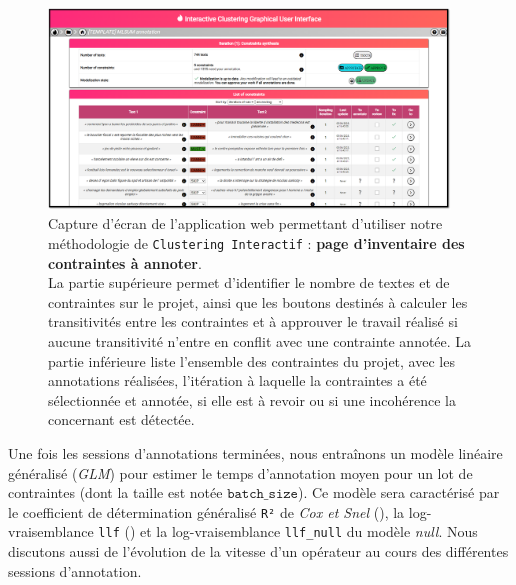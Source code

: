 			\begin{figure}[!htb]
				\centering
				\includegraphics[width=0.95\textwidth]{figures/etude-temps-annotation-0application-liste-contraintes}
				\caption{
					Capture d'écran de l'application web permettant d'utiliser notre méthodologie de \texttt{Clustering Interactif} : \textbf{page d'inventaire des contraintes à annoter}.\\
					La partie supérieure permet d'identifier le nombre de textes et de contraintes sur le projet, ainsi que les boutons destinés à calculer les transitivités entre les contraintes et à approuver le travail réalisé si aucune transitivité n'entre en conflit avec une contrainte annotée.
					La partie inférieure liste l'ensemble des contraintes du projet, avec les annotations réalisées, l'itération à laquelle la contraintes a été sélectionnée et annotée, si elle est à revoir ou si une incohérence la concernant est détectée.
				}
				\label{figure:4.3.1-ETUDE-COUTS-TEMPS-ANNOTATION-APPLICATION-LISTE-CONTRAINTES}
			\end{figure}
			
			
			Une fois les sessions d'annotations terminées, nous entraînons un modèle linéaire généralisé (\textit{GLM}) pour estimer le temps d'annotation moyen pour un lot de contraintes (dont la taille est notée $\texttt{batch\_size}$).
			Ce modèle sera caractérisé par le coefficient de détermination généralisé \texttt{R²} de \textit{Cox et Snel} (\cite{diamond-etal:1990:analysis-binary-data}), la log-vraisemblance \texttt{llf} (\cite{edwards:1992:likelihood}) et la log-vraisemblance \texttt{llf\_null} du modèle \textit{null}.
			Nous discutons aussi de l'évolution de la vitesse d'un opérateur au cours des différentes sessions d'annotation.

